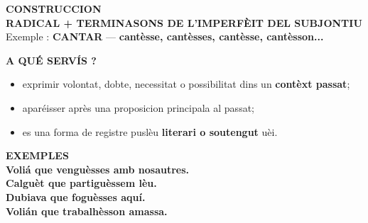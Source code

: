\documentclass[a4paper,11pt]{article}
\begin{document}
\vspace{2.5mm}\hspace*{6mm}\begin{minipage}{0.91\textwidth}
\begin{bluebox}
\textbf{\color{BlueDark}CONSTRUCCION}\\[1mm]\centering
{\Large \textbf{RADICAL + TERMINASONS DE L'IMPERFÈIT DEL SUBJONTIU}}\\[1mm]
\small Exemple : \textbf{CANTAR} — \textbf{cantèsse, cantèsses, cantèsse, cantèsson...}
\end{bluebox}
\vspace{2.5mm}
\begin{center}\end{center}
\vspace{1.5mm}
\begin{bluebox}\textbf{\color{BlueDark}A QUÉ SERVÍS ?}\\[1mm]
\begin{itemize}\setlength{\itemsep}{.4mm}
\item exprimir volontat, dobte, necessitat o possibilitat dins un \textbf{contèxt passat};
\item aparéisser après una proposicion principala al passat;
\item es una forma de registre puslèu \textbf{literari o soutengut} uèi.
\end{itemize}\end{bluebox}
\vspace{2mm}
\begin{bluebox}\textbf{\color{BlueDark}EXEMPLES}\\[1mm]
\textbf{Voliá que venguèsses amb nosautres.}\\
\textbf{Calguèt que partiguèssem lèu.}\\
\textbf{Dubiava que foguèsses aquí.}\\
\textbf{Volián que trabalhèsson amassa.}
\end{bluebox}
\vspace{2mm}

\end{minipage}
\end{document}
